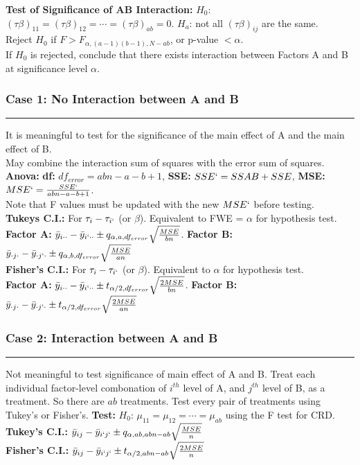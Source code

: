 \documentclass[10pt]{article}
\begin{document}
    \textbf{Test of Significance of AB Interaction: }
    $H_0$: $(\tau \beta)_{11} = (\tau \beta)_{12} = \cdots = (\tau \beta)_{ab} = 0$.
    $H_a$: not all $(\tau \beta)_{ij}$ are the same. \\
    Reject $H_0$ if $F > F_{\alpha, (a-1)(b-1), N - ab}$, or p-value $< \alpha$. \\
    If $H_0$ is rejected, conclude that there exists interaction between Factors A and B at significance level $\alpha$.
    \subsubsection*{Case 1: No Interaction between A and B}
    \hrule width 8cm
    \vspace{6pt}
    It is meaningful to test for the significance of the main effect of A and the main effect of B. \\
    May combine the interaction sum of squares with the error sum of squares. \\
    \textbf{Anova: } \textbf{df: }$df_{error} = abn - a - b + 1$, \textbf{SSE: }$SSE` = SSAB + SSE$, \textbf{MSE: }$MSE` = \frac{SSE`}{abn - a - b + 1}$. \\
    Note that F values must be updated with the new $MSE`$ before testing. \\
    \textbf{Tukeys C.I.:} For $\tau_i - \tau_{i`}$ (or $\beta$). Equivalent to FWE = $\alpha$ for hypothesis test. \\
    \textbf{Factor A: }$\bar{y}_{i \cdot \cdot} - \bar{y}_{i` \cdot \cdot} \pm q_{\alpha, a, df_{error}} \sqrt{\frac{MSE}{bn}}$. 
    \textbf{Factor B: }$\bar{y}_{\cdot j \cdot} - \bar{y}_{\cdot j` \cdot} \pm q_{\alpha, b, df_{error}} \sqrt{\frac{MSE}{an}}$\\
    \textbf{Fisher's C.I.:} For $\tau_i - \tau_{i`}$ (or $\beta$). Equivalent to $\alpha$ for hypothesis test. \\
    \textbf{Factor A: }$\bar{y}_{i \cdot \cdot} - \bar{y}_{i` \cdot \cdot} \pm t_{\alpha/2, df_{error}} \sqrt{\frac{2MSE}{bn}}$.
    \textbf{Factor B: }$\bar{y}_{\cdot j \cdot} - \bar{y}_{\cdot j` \cdot} \pm t_{\alpha/2, df_{error}} \sqrt{\frac{2MSE}{an}}$\\
    
    \clearpage
    \subsubsection*{Case 2: Interaction between A and B}
    \hrule width 8cm
    \vspace{6pt}
    Not meaningful to test significance of main effect of A and B.
    Treat each individual factor-level combonation of $i^{th}$ level of A,
    and $j^{th}$ level of B, as a treatment. So there are $ab$ treatments.
    Test every pair of treatments using Tukey's or Fisher's.
    \textbf{Test:} $H_0$: $\mu_{11} = \mu_{12} = \cdots = \mu_{ab}$ using the F test for CRD. \\
    \textbf{Tukey's C.I.: } $\bar{y}_{ij} - \bar{y}_{i` j`} \pm q_{\alpha, ab, abn - ab}\sqrt{\frac{MSE}{n}}$ \\
    \textbf{Fisher's C.I.: } $\bar{y}_{ij} - \bar{y}_{i` j`} \pm t_{\alpha/2, abn - ab}\sqrt{\frac{2MSE}{n}}$ \\
  
\end{document}
